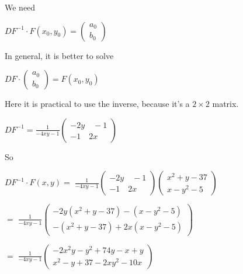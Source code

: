 \documentclass[a4paper,12pt]{report}
\begin{document}
	\noindent We need
	\begin{center}
	$ DF^{-1}\cdot F(x_0,y_0) =
	\begin{pmatrix}
		a_0\\
		b_0
	\end{pmatrix}
	$
	\end{center}
	
	\noindent In general, it is better to solve
	\begin{center}
		$ DF \cdot 
		\begin{pmatrix}
			a_0\\
			b_0
		\end{pmatrix}
		= F(x_0,y_0)
		$
	\end{center}
	
	\noindent Here it is practical to use the inverse, because it's a $2 \times 2$ matrix.
	\begin{center}
	$DF^{-1} = \frac{1}{-4xy - 1} \!\!
	\begin{pmatrix}
		-2y \quad -1 \\
		-1 \quad 2x
	\end{pmatrix}
	$
	\end{center}

	\noindent So
	\begin{center}

	$DF^{-1}\cdot F(x,y) = \; $\large$ \frac{1}{-4xy-1} \! $\normalsize$
	\begin{pmatrix}
		-2y \quad -1 \\
		-1 \quad 2x	
	\end{pmatrix}
	\begin{pmatrix}
		x^2 + y - 37\\
		x- y^2 - 5
	\end{pmatrix}
	$

	\vspace{5mm}

	$ = \; $\large$ \frac{1}{-4xy-1} \! $\normalsize$
	\begin{pmatrix}
		-2y(x^2+y-37) - (x-y^2-5)\\
		-(x^2+y-37) + 2x(x-y^2-5)
	\end{pmatrix}
	$
	
	\vspace{5mm}
	
	$ = \; $\large$ \frac{1}{-4xy-1} \! $\normalsize$
	\begin{pmatrix}
		-2x^2y - y^2 + 74y - x + y \\
		x^2 - y + 37 - 2xy^2 - 10x
	\end{pmatrix}
	$
	\end{center}
\end{document}
